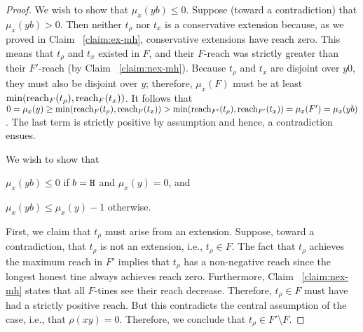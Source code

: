 \begin{proof}
    We wish to show that $\mu_x(yb) \leq 0$.
    Suppose (toward a contradiction) that $\mu_x(yb) > 0$. 
    Then neither $t_\rho$ nor $t_x$ is a conservative extension because, as we proved in Claim ~\ref{claim:ex-mh}, conservative extensions have reach zero. This means that $t_\rho$ and $t_x$ existed in $F$, and their $F$-reach was strictly greater than their $F'$-reach (by Claim ~\ref{claim:nex-mh}). 
    Because $t_\rho$ and $t_x$ 
    are 
    disjoint over $y0$, they must also be disjoint over $y$; therefore, $\mu_x(F)$ must be at least $\min(\operatorname{reach}_F(t_\rho),\operatorname{reach}_F(t_x))$. 
    It follows that 
    $0 
    = \mu_x(y) 
    \geq \min(\operatorname{reach}_F(t_\rho),\operatorname{reach}_F(t_x))
    > \min(\operatorname{reach}_{F'}(t_\rho),\operatorname{reach}_{F'}(t_x))
    = \mu_x(F') = \mu_x(yb)
    $. 
    The last term is strictly positive by assumption and hence, a contradiction ensues.

    We wish to show that 
    \begin{enumerate*}[label=(\textit{\roman*})]
      \item $\mu_x(yb) \leq 0$ if $b = \mathtt{H}$ and $\mu_x(y) = 0$, and 
      \item $\mu_x(yb) \leq \mu_x(y) - 1$ otherwise.
    \end{enumerate*}
    First, we claim that $t_\rho$ must arise from an extension. 
    Suppose, toward a contradiction, that $t_\rho$ is not an extension, 
    i.e., $t_\rho \in F$. 
    The fact that $t_\rho$ achieves the maximum reach in $F'$ 
    implies that 
    $t_\rho$ has a non-negative reach 
    since the longest honest tine always achieves reach zero. 
    Furthermore, 
    Claim ~\ref{claim:nex-mh} states that 
    all $F$-tines see their reach decrease. 
    Therefore, $t_\rho \in F$ must have had a strictly positive reach. 
    But this contradicts the central assumption of the case, i.e., 
    that $\rho(xy)=0$. 
    Therefore, we conclude that $t_\rho \in F' \setminus F$.


\end{proof}
